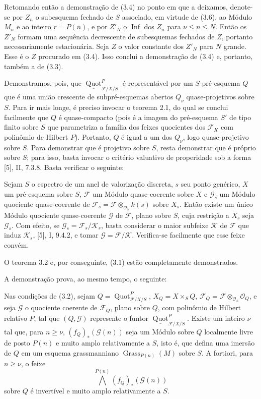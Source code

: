 Retomando então a demonstração de (3.4) no ponto em que a deixamos, denote-se
por $Z_n$ o subesquema fechado de $S$ associado, em virtude de (3.6), ao
Módulo $M_n$ e ao inteiro $r=P(n)$, e por $Z'_N$ o
$\operatorname{Inf}$ dos $Z_n$ para $\nu\leq n\leq N$. Então os $Z'_N$
formam uma sequência decrescente de subesquemas fechados de $Z$, portanto
necessariamente estacionária. Seja $Z$ o valor constante dos $Z'_N$ para $N$
grande. Esse é o $Z$ procurado em (3.4). Isso conclui a demonstração de (3.4)
e, portanto, também a de (3.3).

Demonstramos, pois, que
$\underline{\operatorname{Quot}}^P_{\mathcal F/X/S}$ é representável por um
$S$-pré-esquema $Q$ que é uma união crescente de subpré-esquemas abertos
$Q_\nu$ quase-projetivos sobre $S$. Para ir mais longe, é preciso invocar o
teorema 2.1, do qual se conclui facilmente que $Q$ é quase-compacto (pois é a
imagem do pré-esquema $S'$ de tipo finito sobre $S$ que parametriza a família
dos feixes quocientes dos $\mathcal F_K$ com polinômio de Hilbert $P$).
Portanto, $Q$ é igual a um dos $Q_\nu$, logo quase-projetivo sobre $S$. Para
demonstrar que é projetivo sobre $S$, resta demonstrar que é próprio sobre
$S$; para isso, basta invocar o critério valuativo de properidade sob a forma
[5], II, 7.3.8. Basta verificar o seguinte:

 Sejam $S$ o espectro de um anel de valorização discreta,
$s$ seu ponto genérico, $X$ um pré-esquema sobre $S$, $\mathcal F$ um Módulo
quase-coerente sobre $X$ e $\mathcal G_s$ um Módulo quociente quase-coerente
de $\mathcal F_s=\mathcal F\otimes_{\mathcal O_S}k(s)$ sobre $X_s$. Então
existe um único Módulo quociente quase-coerente $\mathcal G$ de $\mathcal F$,
plano sobre $S$, cuja restrição a $X_s$ seja $\mathcal G_s$.
Com efeito, se $\mathcal G_s=\mathcal F_s/\mathcal K_s$, basta considerar o
maior subfeixe $\mathcal K$ de $\mathcal F$ que induz $\mathcal K_s$, [5],
I, 9.4.2, e tomar $\mathcal G=\mathcal F/\mathcal K$. Verifica-se facilmente
que esse feixe convém.

O teorema 3.2 e, por conseguinte, (3.1) estão completamente demonstrados.

A demonstração prova, ao mesmo tempo, o seguinte:

 Nas condições de (3.2), sejam
$Q=\operatorname{Quot}^P_{\mathcal F/X/S}$, $X_Q=X\times_SQ$,
$\mathcal F_Q=\mathcal F\otimes_{\mathcal O_S}\mathcal O_Q$, e seja
$\mathcal G$ o quociente coerente de $\mathcal F_Q$, plano sobre $Q$, com
polinômio de Hilbert relativo $P$, tal que $(Q,\mathcal G)$ represente o
funtor $\underline{\operatorname{Quot}}^P_{\mathcal F/X/S}$. Existe um
inteiro $\nu$ tal que, para $n\geq\nu$,
$(f_Q)_*(\mathcal G(n))$ seja um Módulo sobre $Q$ localmente livre de posto
$P(n)$ e muito amplo relativamente a $S$, isto é, que defina uma imersão de
$Q$ em um esquema grassmanniano $\operatorname{Grass}_{P(n)}(M)$ sobre $S$.
A fortiori, para $n\geq\nu$, o feixe
\[
\bigwedge^{P(n)}(f_Q)_*(\mathcal G(n))
\]
sobre $Q$ é invertível e muito amplo relativamente a $S$.

